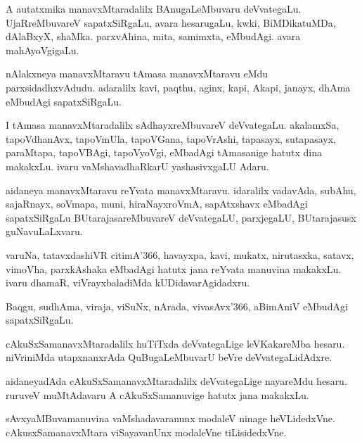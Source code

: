 \documentclass{article}
\begin{document}
\begin{mn}%
A autatxmika manavxMtaradalilx BAnugaLeMbuvaru
deVvategaLu. UjaRreMbuvareV sapatxSiRgaLu, avara hesarugaLu, kwki,
BiMDikatuMDa, dAlaBxyX, shaMka. parxvAhina, mita, samimxta,
eMbudAgi. avara mahAyoVgigaLu.
\end{mn}

\begin{mn}
nAlakxneya manavxMtaravu tAmasa manavxMtaravu eMdu
parxsidadhxvAdudu. adaralilx kavi, paqthu, aginx, kapi, Akapi, janayx,
dhAma eMbudAgi sapatxSiRgaLu.
\end{mn}

\begin{mn}%
I tAmasa manavxMtaradalilx sAdhayxreMbuvareV deVvategaLu. akalamxSa,
tapoVdhanAvx, tapoVmUla, tapoVGana, tapoVrAshi, tapasayx, sutapasayx,
paraMtapa, tapoVBAgi, tapoVyoVgi, eMbadAgi tAmasanige hatutx dina
makakxLu. ivaru vaMshavadhaRkarU yashasivxgaLU Adaru.
\end{mn}

\begin{mn}%
aidaneya manavxMtaravu reYvata manavxMtaravu. idaralilx vadavAda,
subAhu, sajaRnayx, soVmapa, muni, hiraNayxroVmA, sapAtxshavx eMbadAgi
sapatxSiRgaLu BUtarajasareMbuvareV deVvategaLU, parxjegaLU,
BUtarajasusx guNavuLaLxvaru.
\end{mn}

\begin{mn}
varuNa, tatavxdashiVR citimA\char'366, havayxpa, kavi, mukatx, nirutasxka,
satavx, vimoVha, parxkAshaka eMbadAgi hatutx jana reYvata manuvina
makakxLu. ivaru dhamaR, viVrayxbaladiMda kUDidavarAgidadxru.
\end{mn}

\begin{mn}
Baqgu, sudhAma, viraja, viSuNx, nArada, vivasAvx\char'366, aBimAniV
eMbudAgi sapatxSiRgaLu.
\end{mn}

\begin{mn}
cAkuSxSamanavxMtaradalilx huTiTxda deVvategaLige leVKakareMba
hesaru. niVriniMda utapxnanxrAda QuBugaLeMbuvarU beVre deVvategaLidAdxre.
\end{mn}

\begin{mn}
aidaneyadAda cAkuSxSamanavxMtaradalilx deVvategaLige nayareMdu
hesaru. ruruveV muMtAdavaru A cAkuSxSamanuvige hatutx jana makakxLu.
\end{mn}

\begin{mn}%
sAvxyaMBuvamanuvina vaMshadavaranunx modaleV ninage
heVLidedxVne. cAkusxSamanavxMtara viSayavanUnx modaleVne tiLisidedxVne.
\end{mn}
\end{document}
